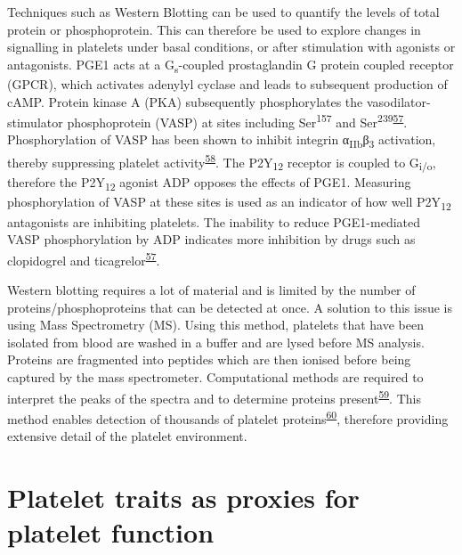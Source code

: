 \documentclass[11pt,twoside]{bristolthesis}
\begin{document}
Techniques such as Western Blotting can be used to quantify the levels of total protein or phosphoprotein. This can therefore be used to explore changes in signalling in platelets under basal conditions, or after stimulation with agonists or antagonists. PGE1 acts at a G\textsubscript{s}-coupled prostaglandin G protein coupled receptor (GPCR), which activates adenylyl cyclase and leads to subsequent production of cAMP. Protein kinase A (PKA) subsequently phosphorylates the vasodilator-stimulator phosphoprotein (VASP) at sites including Ser\textsuperscript{157} and Ser\textsuperscript{239}\textsuperscript{\protect\hyperlink{ref-Hezard2005}{57}}. Phosphorylation of VASP has been shown to inhibit integrin α\textsubscript{IIb}β\textsubscript{3} activation, thereby suppressing platelet activity\textsuperscript{\protect\hyperlink{ref-Horstrup1994}{58}}. The P2Y\textsubscript{12} receptor is coupled to G\textsubscript{i/o}, therefore the P2Y\textsubscript{12} agonist ADP opposes the effects of PGE1. Measuring phosphorylation of VASP at these sites is used as an indicator of how well P2Y\textsubscript{12} antagonists are inhibiting platelets. The inability to reduce PGE1-mediated VASP phosphorylation by ADP indicates more inhibition by drugs such as clopidogrel and ticagrelor\textsuperscript{\protect\hyperlink{ref-Hezard2005}{57}}.

Western blotting requires a lot of material and is limited by the number of proteins/phosphoproteins that can be detected at once. A solution to this issue is using Mass Spectrometry (MS). Using this method, platelets that have been isolated from blood are washed in a buffer and are lysed before MS analysis. Proteins are fragmented into peptides which are then ionised before being captured by the mass spectrometer. Computational methods are required to interpret the peaks of the spectra and to determine proteins present\textsuperscript{\protect\hyperlink{ref-Wang2013}{59}}. This method enables detection of thousands of platelet proteins\textsuperscript{\protect\hyperlink{ref-Huang2021}{60}}, therefore providing extensive detail of the platelet environment.

\hypertarget{platelet-traits-as-proxies-for-platelet-function}{%
\section{Platelet traits as proxies for platelet function}\label{platelet-traits-as-proxies-for-platelet-function}}
\end{document}
